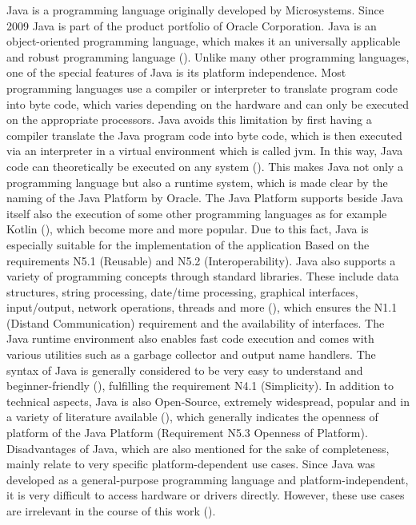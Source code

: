 Java is a programming language originally developed by Microsystems. Since 2009 Java is part of the product portfolio of Oracle Corporation. Java is an object-oriented programming language, which makes it an universally applicable and robust programming language (\cite{Ullenboom.2017}). Unlike many other programming languages, one of the special features of Java is its platform independence. Most programming languages use a compiler or interpreter to translate program code into byte code, which varies depending on the hardware and can only be executed on the appropriate processors. Java avoids this limitation by first having a compiler translate the Java program code into byte code, which is then executed via an interpreter in a virtual environment which is called \ac{jvm}. In this way, Java code can theoretically be executed on any system (\cite{Ullenboom.2017}). This makes Java not only a programming language but also a runtime system, which is made clear by the naming of the Java Platform by Oracle. The Java Platform supports beside Java itself also the execution of some other programming languages as for example Kotlin (\cite{kotlinlang.2023}), which become more and more popular. Due to this fact, Java is especially suitable for the implementation of the application Based on the requirements N5.1 (Reusable) and N5.2 (Interoperability). Java also supports a variety of programming concepts through standard libraries. These include data structures, string processing, date/time processing, graphical interfaces, input/output, network operations, threads and more (\cite{Ullenboom.2017}), which ensures the N1.1 (Distand Communication) requirement and the availability of interfaces. The Java runtime environment also enables fast code execution and comes with various utilities such as a garbage collector and output name handlers. The syntax of Java is generally considered to be very easy to understand and beginner-friendly (\cite{Ullenboom.2017}), fulfilling the requirement N4.1 (Simplicity). In addition to technical aspects, Java is also Open-Source, extremely widespread, popular and in a variety of literature available (\cite{Ullenboom.2017}), which generally indicates the openness of platform of the Java Platform (Requirement N5.3 Openness of Platform). Disadvantages of Java, which are also mentioned for the sake of completeness, mainly relate to very specific platform-dependent use cases. Since Java was developed as a general-purpose programming language and platform-independent, it is very difficult to access hardware or drivers directly. However, these use cases are irrelevant in the course of this work (\cite{Ullenboom.2017}). 


